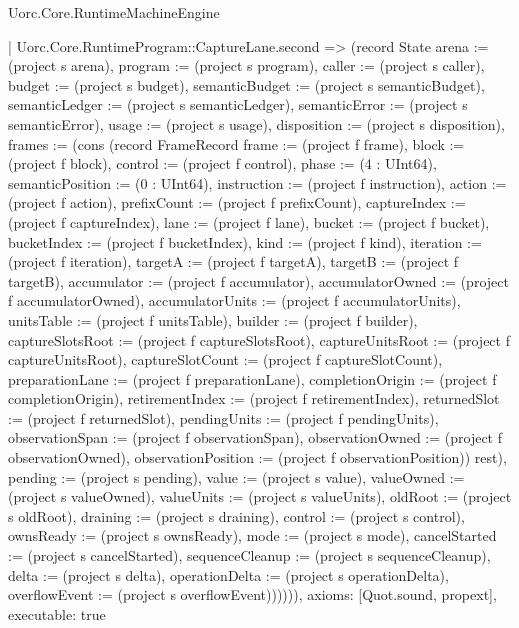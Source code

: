 \begin{lexlean}{Uorc.Core.RuntimeMachineEngine}
\begin{semanticmodule}
{        | Uorc.Core.RuntimeProgram::CaptureLane.second => (record State {arena := (project s arena), program := (project s program), caller := (project s caller), budget := (project s budget), semanticBudget := (project s semanticBudget), semanticLedger := (project s semanticLedger), semanticError := (project s semanticError), usage := (project s usage), disposition := (project s disposition), frames := (cons (record FrameRecord {frame := (project f frame), block := (project f block), control := (project f control), phase := (4 : UInt64), semanticPosition := (0 : UInt64), instruction := (project f instruction), action := (project f action), prefixCount := (project f prefixCount), captureIndex := (project f captureIndex), lane := (project f lane), bucket := (project f bucket), bucketIndex := (project f bucketIndex), kind := (project f kind), iteration := (project f iteration), targetA := (project f targetA), targetB := (project f targetB), accumulator := (project f accumulator), accumulatorOwned := (project f accumulatorOwned), accumulatorUnits := (project f accumulatorUnits), unitsTable := (project f unitsTable), builder := (project f builder), captureSlotsRoot := (project f captureSlotsRoot), captureUnitsRoot := (project f captureUnitsRoot), captureSlotCount := (project f captureSlotCount), preparationLane := (project f preparationLane), completionOrigin := (project f completionOrigin), retirementIndex := (project f retirementIndex), returnedSlot := (project f returnedSlot), pendingUnits := (project f pendingUnits), observationSpan := (project f observationSpan), observationOwned := (project f observationOwned), observationPosition := (project f observationPosition)}) rest), pending := (project s pending), value := (project s value), valueOwned := (project s valueOwned), valueUnits := (project s valueUnits), oldRoot := (project s oldRoot), draining := (project s draining), control := (project s control), ownsReady := (project s ownsReady), mode := (project s mode), cancelStarted := (project s cancelStarted), sequenceCleanup := (project s sequenceCleanup), delta := (project s delta), operationDelta := (project s operationDelta), overflowEvent := (project s overflowEvent)}))))),
  axioms: [Quot.sound, propext],
  executable: true
}


\end{semanticmodule}
\end{lexlean}
